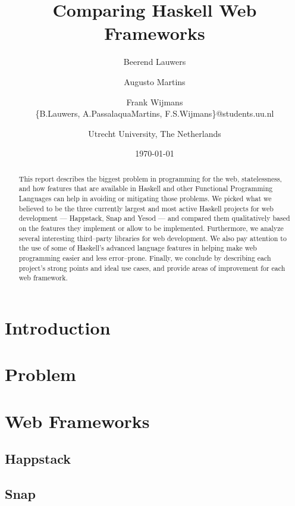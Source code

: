 \documentclass[twocolumn,9pt,a4paper]{article}
\title{Comparing Haskell Web Frameworks}
\author{
	Beerend Lauwers \and Augusto Martins \and Frank Wijmans\\
	\{B.Lauwers, A.PassalaquaMartins, F.S.Wijmans\}@students.uu.nl\\
	\and
	Utrecht University, The Netherlands}
\date{\today}
\begin{document}
	\maketitle
	
	\begin{abstract}
		This report describes the biggest problem in programming for the web, statelessness, and how features that are available in Haskell and other Functional Programming Languages can help in avoiding or mitigating those problems.
		We picked what we believed to be the three currently largest and most active Haskell projects for web development --- Happstack, Snap and Yesod --- and compared them qualitatively based on the features they implement or allow to be implemented.
        Furthermore, we analyze several interesting third--party libraries for web development.
		We also pay attention to the use of some of Haskell's advanced language features in helping make web programming easier and less error--prone.
		Finally, we conclude by describing each project's strong points and ideal use cases, and provide areas of improvement for each web framework.
	\end{abstract}
	
	\section{Introduction}\label{intro}
	
	
	
	\section{Problem}\label{problem}

	
	
	\section{Web Frameworks}\label{frameworks}
	
	
	
		\subsection{Happstack}\label{happ}
		
	
		\subsection{Snap}\label{snap}
		
	
\end{document}
